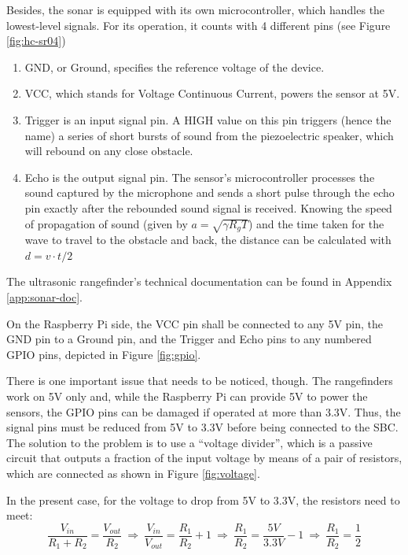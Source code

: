 Besides, the sonar is equipped with its own microcontroller, which handles the lowest-level signals.
For its operation, it counts with 4 different pins (see Figure \ref{fig:hc-sr04}) 
\begin{enumerate}
	\item GND, or Ground, specifies the reference voltage of the device.
	\item VCC, which stands for Voltage Continuous Current, powers the sensor at 5V.
	\item Trigger is an input signal pin.
		A HIGH value on this pin triggers (hence the name) a series of short bursts of sound from the piezoelectric speaker, which will rebound on any close obstacle.
	\item Echo is the output signal pin.
		The sensor's microcontroller processes the sound captured by the microphone and sends a short pulse through the echo pin exactly after the rebounded sound signal is received.
		Knowing the speed of propagation of sound (given by $a=\sqrt{\gamma R_g T}$) and the time taken for the wave to travel to the obstacle and back, the distance can be calculated with $d=v \cdot t/2$
\end{enumerate}
The ultrasonic rangefinder's technical documentation can be found in Appendix \ref{app:sonar-doc}.

On the Raspberry Pi side, the VCC pin shall be connected to any 5V pin, the GND pin to a Ground pin, and the Trigger and Echo pins to any numbered GPIO pins, depicted in Figure \ref{fig:gpio}.



There is one important issue that needs to be noticed, though.
The rangefinders work on 5V only and, while the Raspberry Pi can provide 5V to power the sensors, the GPIO pins can be damaged if operated at more than 3.3V.
Thus, the signal pins must be reduced from 5V to 3.3V before being connected to the SBC.
The solution to the problem is to use a ``voltage divider'', which is a passive circuit that outputs a fraction of the input voltage by means of a pair of resistors, which are connected as shown in Figure \ref{fig:voltage}.



In the present case, for the voltage to drop from 5V to 3.3V, the resistors need to meet:
\begin{equation}
	\frac{V_{in}}{R_1+R_2}=\frac{V_{out}}{R_2} \ \Rightarrow\ \frac{V_{in}}{V_{out}}=\frac{R_1}{R_2}+1 \ \Rightarrow\ \frac{R_1}{R_2}=\frac{5V}{3.3V}-1 \ \Rightarrow\ \frac{R_1}{R_2}=\frac{1}{2} 
\end{equation}

